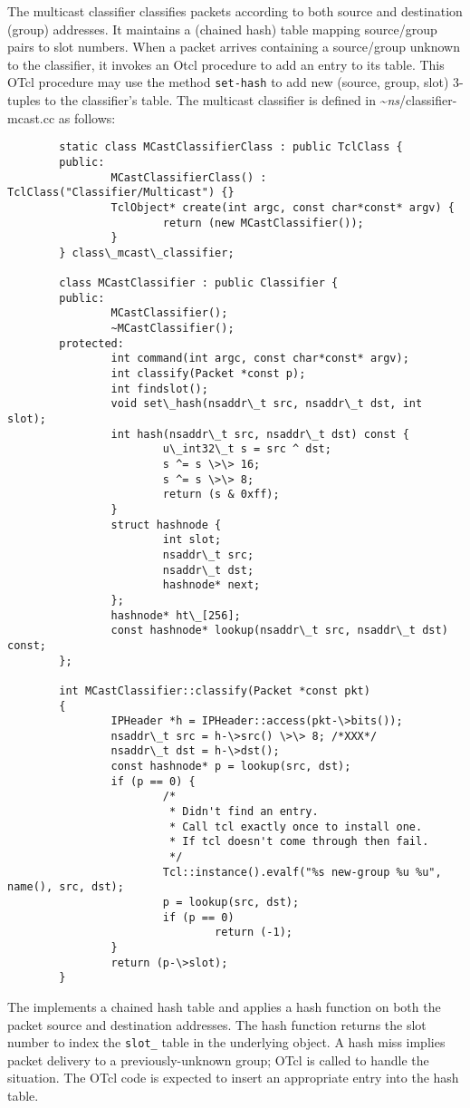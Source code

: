 The multicast classifier classifies packets
according to both source and destination (group) addresses.
It maintains a (chained hash) table mapping source/group pairs to slot numbers.
When a packet arrives containing a source/group unknown to the classifier,
it invokes an Otcl procedure 
to add an entry to its table.
This OTcl procedure may use the method {\tt set-hash} to add
new (source, group, slot) 3-tuples to the classifier's table.
The multicast classifier is defined in \textasciitilde\emph{ns}/{classifier-mcast.cc}
as follows:
\begin{verbatim}
        static class MCastClassifierClass : public TclClass {
        public:
                MCastClassifierClass() : TclClass("Classifier/Multicast") {}
                TclObject* create(int argc, const char*const* argv) {
                        return (new MCastClassifier());
                }
        } class\_mcast\_classifier;

        class MCastClassifier : public Classifier {
        public:
                MCastClassifier();
                ~MCastClassifier();
        protected:
                int command(int argc, const char*const* argv);
                int classify(Packet *const p);
                int findslot();
                void set\_hash(nsaddr\_t src, nsaddr\_t dst, int slot);
                int hash(nsaddr\_t src, nsaddr\_t dst) const {
                        u\_int32\_t s = src ^ dst;
                        s ^= s \>\> 16;
                        s ^= s \>\> 8;
                        return (s & 0xff);
                }
                struct hashnode {
                        int slot;
                        nsaddr\_t src;
                        nsaddr\_t dst;
                        hashnode* next;
                };
                hashnode* ht\_[256];
                const hashnode* lookup(nsaddr\_t src, nsaddr\_t dst) const;
        };

        int MCastClassifier::classify(Packet *const pkt)
        {
                IPHeader *h = IPHeader::access(pkt-\>bits());
                nsaddr\_t src = h-\>src() \>\> 8; /*XXX*/
                nsaddr\_t dst = h-\>dst();
                const hashnode* p = lookup(src, dst);
                if (p == 0) {
                        /*
                         * Didn't find an entry.
                         * Call tcl exactly once to install one.
                         * If tcl doesn't come through then fail.
                         */
                        Tcl::instance().evalf("%s new-group %u %u", name(), src, dst);
                        p = lookup(src, dst);
                        if (p == 0)
                                return (-1);
                }
                return (p-\>slot);
        }
\end{verbatim}
The   implements a chained hash table
and applies a hash function on both the packet source and
destination addresses.
The hash function returns the slot number
to index the {\tt slot\_} table in the underlying object.
A hash miss implies packet delivery to a previously-unknown group;
OTcl is called to handle the situation.
The OTcl code is expected to insert an appropriate entry into the hash table.

